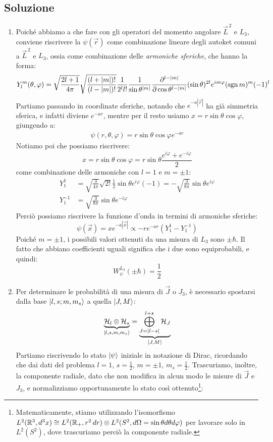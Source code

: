 \documentclass[../../FisicaTeorica.tex]{subfiles}
\begin{document}
\subsection{Soluzione}
\begin{enumerate}
\item Poiché abbiamo a che fare con gli operatori del momento angolare $\vec{L}^{\,2}$ e $L_3$, conviene riscrivere la $\psi(\vec{r})$ come combinazione lineare degli autoket comuni a $\vec{L}^{\,2}$ e $L_3$, ossia come combinazione delle \textit{armoniche sferiche}, che hanno la forma:
\[
Y^m_l(\theta,\varphi)=\sqrt{\frac{2l+1}{4\pi}}\sqrt{\frac{(l+|m|)!}{(l-|m|)!}}\frac{1}{2^l l!} \frac{1}{\sin\theta^{|m|}}\frac{\partial^{l-|m|}}{\partial \cos\theta^{l-|m|}}(\sin\theta)^{2l} e^{im\varphi}(\operatorname{sgn} m)^{m}(-1)^l
\]
Partiamo passando in coordinate sferiche, notando che $e^{-a|\vec{r}|}$ ha già simmetria sferica, e infatti diviene $e^{-ar}$, mentre per il resto usiamo $x=r\sin\theta\cos\varphi$, giungendo a:
\begin{align*}
\psi(r, \theta,\varphi) = r\sin\theta \cos\varphi e^{-ar}
\end{align*}
Notiamo poi che possiamo riscrivere:
\[
x=r\sin\theta\cos\varphi= r\sin\theta \frac{e^{i\varphi}+e^{-i\varphi}}{2}
\]
come combinazione delle armoniche con $l=1$ e $m=\pm 1$:
\begin{align*}
Y^1_1 &= \sqrt{\frac{3}{4\pi}}\sqrt{2!}\frac{1}{2}\sin\theta e^{i\varphi}(-1)=-\sqrt{\frac{3}{8\pi}}\sin\theta e^{i\varphi}\\
Y^{-1}_1 &= \sqrt{\frac{3}{8\pi}} \sin\theta e^{-i\varphi}
\end{align*}
Perciò possiamo riscrivere la funzione d'onda in termini di armoniche sferiche:
\[
\psi(\vec{x})=x e^{-a|\vec{x}|}\propto-r e^{-ar}(Y_1^1 - Y^{-1}_1)
\]
Poiché $m=\pm 1$, i possibili valori ottenuti da una misura di $L_3$ sono $\pm\hbar$. Il fatto che abbiano coefficienti uguali significa che i due sono equiprobabili, e quindi:
\[
W_\psi^{L_3}(\pm \hbar) = \frac{1}{2}
\]
\item Per determinare le probabilità di una misura di $\vec{J}$ o $J_3$, è necessario spostarsi dalla base $\Ket{l, s; m, m_s}$ a quella $\Ket{J,M}$:
\begin{align*}
\displaystyle \underbrace{\mathcal{H}_{l}\otimes \mathcal{H}_s}_{\Ket{l,s,m,m_s}} = \underbrace{\bigoplus_{J=|l-s|}^{l+s}\mathcal{H}_J}_{\Ket{J, M}}
\end{align*}
Partiamo riscrivendo lo stato $\Ket{\psi}$ iniziale in notazione di Dirac, ricordando che dai dati del problema $l=1$, $s=\frac{1}{2}$, $m=\pm 1$, $m_s=\frac{1}{2}$. Trascuriamo, inoltre, la componente radiale, dato che non modifica in alcun modo le misure di $\vec{J}$ e $J_3$, e normalizziamo opportunamente lo stato così ottenuto\footnote{Matematicamente, stiamo utilizzando l'isomorfismo $L^2(\mathbb{R}^3, d^3x)\cong L^2(\mathbb{R}_+, r^2\,dr)\otimes L^2(S^2, d\Omega = \sin\theta d\theta d\varphi)$ per lavorare solo in $L^2(S^2)$, dove trascuriamo perciò la componente radiale.}:

\end{enumerate}
\end{document}
